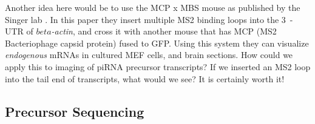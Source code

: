     \citep{Lee2014a} %

    Another idea here would be to use the MCP x MBS mouse as published by the Singer lab \citep{Park2014}. In this paper they insert multiple MS2 binding loops into the 3\textprime~-UTR of \textit{$beta$-actin}, and cross it with another mouse that has MCP (MS2 Bacteriophage capsid protein) fused to GFP. Using this system they can visualize \textit{endogenous} mRNAs in cultured MEF cells, and brain sections. How could we apply this to imaging of piRNA precursor transcripts? If we inserted an MS2 loop into the tail end of transcripts, what would we see? It is certainly worth it!

  \subsection{Precursor Sequencing}
    \label{Disc:subsec:Sequencing of Precursors}



    \citep{Ke2013} %
    \citep{Lee2014a} %



